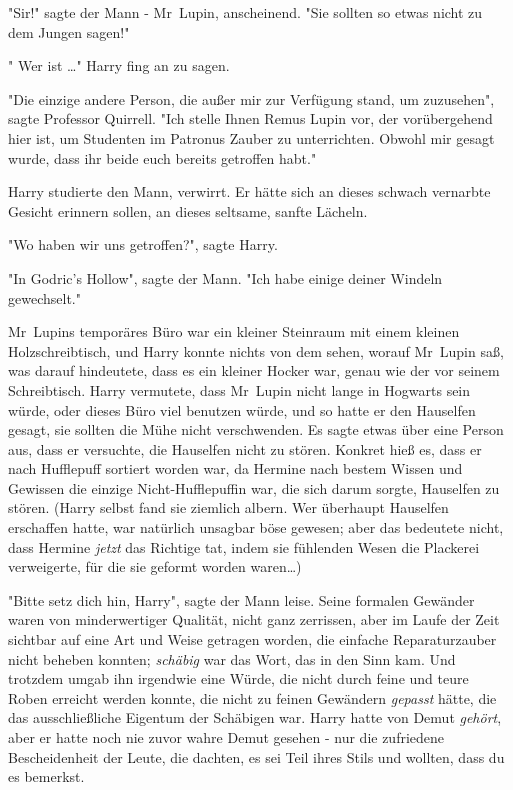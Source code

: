 {"Sir!" sagte der Mann - Mr~Lupin, anscheinend. "Sie sollten so etwas nicht zu dem Jungen sagen!"

" Wer ist …" Harry fing an zu sagen.

"Die einzige andere Person, die außer mir zur Verfügung stand, um zuzusehen", sagte Professor Quirrell. "Ich stelle Ihnen Remus Lupin vor, der vorübergehend hier ist, um Studenten im Patronus Zauber zu unterrichten. Obwohl mir gesagt wurde, dass ihr beide euch bereits getroffen habt."

Harry studierte den Mann, verwirrt. Er hätte sich an dieses schwach vernarbte Gesicht erinnern sollen, an dieses seltsame, sanfte Lächeln.

"Wo haben wir uns getroffen?", sagte Harry.

"In Godric's Hollow", sagte der Mann. "Ich habe einige deiner Windeln gewechselt."

Mr~Lupins temporäres Büro war ein kleiner Steinraum mit einem kleinen Holzschreibtisch, und Harry konnte nichts von dem sehen, worauf Mr~Lupin saß, was darauf hindeutete, dass es ein kleiner Hocker war, genau wie der vor seinem Schreibtisch. Harry vermutete, dass Mr~Lupin nicht lange in Hogwarts sein würde, oder dieses Büro viel benutzen würde, und so hatte er den Hauselfen gesagt, sie sollten die Mühe nicht verschwenden. Es sagte etwas über eine Person aus, dass er versuchte, die Hauselfen nicht zu stören. Konkret hieß es, dass er nach Hufflepuff sortiert worden war, da Hermine nach bestem Wissen und Gewissen die einzige Nicht-Hufflepuffin war, die sich darum sorgte, Hauselfen zu stören. (Harry selbst fand sie ziemlich albern. Wer überhaupt Hauselfen erschaffen hatte, war natürlich unsagbar böse gewesen; aber das bedeutete nicht, dass Hermine \emph{jetzt} das Richtige tat, indem sie fühlenden Wesen die Plackerei verweigerte, für die sie geformt worden waren…)

"Bitte setz dich hin, Harry", sagte der Mann leise. Seine formalen Gewänder waren von minderwertiger Qualität, nicht ganz zerrissen, aber im Laufe der Zeit sichtbar auf eine Art und Weise getragen worden, die einfache Reparaturzauber nicht beheben konnten; \emph{schäbig} war das Wort, das in den Sinn kam. Und trotzdem umgab ihn irgendwie eine Würde, die nicht durch feine und teure Roben erreicht werden konnte, die nicht zu feinen Gewändern \emph{gepasst} hätte, die das ausschließliche Eigentum der Schäbigen war. Harry hatte von Demut \emph{gehört}, aber er hatte noch nie zuvor wahre Demut gesehen - nur die zufriedene Bescheidenheit der Leute, die dachten, es sei Teil ihres Stils und wollten, dass du es bemerkst.

}
